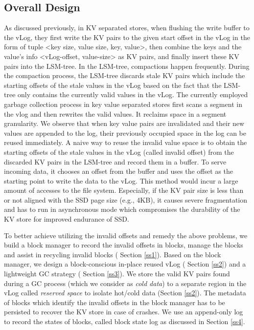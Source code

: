 \documentclass[sigconf]{acmart}
\begin{document}
\subsection{Overall Design}
As discussed previously, in KV separated stores, when flushing the write buffer to the vLog, they first write the KV pairs to the given start offset in the vLog in the form of tuple \textless key size, value size, key, value\textgreater, then combine the keys and the value's info \textless vLog-offset, value-size\textgreater{} as KV pairs, and finally insert these KV pairs into the LSM-tree. In the LSM-tree, compactions happen frequently. During the compaction process, the LSM-tree discards stale KV pairs which include the starting offsets of the stale values in the vLog based on the fact that the LSM-tree only contains the currently valid values in the vLog. The currently employed garbage collection process in key value separated stores first scans a segment in the vlog and then rewrites the valid values. It reclaims space in a segment granularity.  We observe that when key value pairs are invalidated and their new values are appended to the log, their previously occupied space in the log can be reused immediately.  A naive way to reuse the invalid value space is to obtain the starting offsets of the stale values in the vLog (called invalid offset) from the discarded KV pairs in the LSM-tree and record them in a buffer. To serve incoming data, it chooses an offset from the buffer and uses the offset as the starting point to write the data to the vLog. This method would incur a large amount of accesses to the file system. Especially, if the KV pair size is less than or not aligned with the SSD page size (e.g., 4KB), it causes severe fragmentation and has to run in asynchronous mode which compromises the durability of the KV store for improved endurance of SSD.

To better achieve utilizing the invalid offsets and remedy the above problems, we build a block manager to record the invalid offsets in blocks, manage the blocks and assist in recycling invalid blocks ( Section \ref{ss1}). Based on the block manager, we design a block-conscious in-place reused vLog ( Section \ref{ss2}) and a lightweight GC strategy ( Section \ref{ss3}). We store the valid KV pairs found during a GC process (which we consider as \textit{cold data}) to a separate region in the vLog called \textit{reserved space} to isolate hot/cold data (Section \ref{ss2}). The metadata of blocks which identify the invalid offsets in the block manager has to be persisted to recover the KV store in case of crashes.  We use an append-only log to record the states of blocks, called block state log as discussed in Section \ref{ss4}. 
\end{document}
